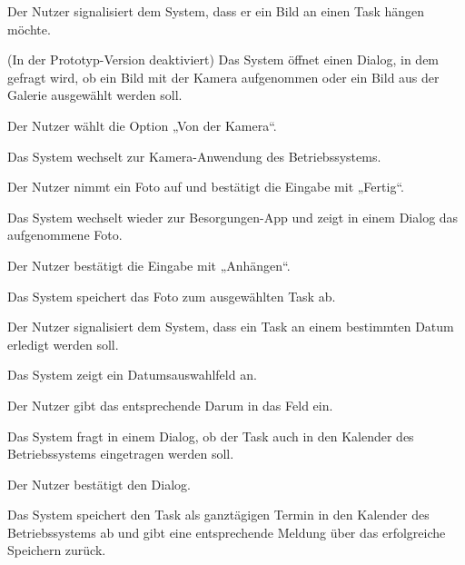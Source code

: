 	\begin{description}
		\begin{verlauf}
		
			\item Der Nutzer signalisiert dem System, dass er ein Bild an einen Task hängen möchte.
			\item (In der Prototyp-Version deaktiviert) Das System öffnet einen Dialog, in dem gefragt wird, ob ein Bild mit der Kamera aufgenommen oder ein Bild aus der Galerie ausgewählt werden soll.
			\item Der Nutzer wählt die Option „Von der Kamera“.
			\item Das System wechselt zur Kamera-Anwendung des Betriebssystems.
			\item Der Nutzer nimmt ein Foto auf und bestätigt die Eingabe mit „Fertig“.
			\item Das System wechselt wieder zur Besorgungen-App und zeigt in einem Dialog das aufgenommene Foto.
			\item Der Nutzer bestätigt die Eingabe mit „Anhängen“.
			\item Das System speichert das Foto zum ausgewählten Task ab.
				
		\end{verlauf}
		
	\end{description}


	\begin{description}
		\actors{Initiiert vom Listenmitglied}
		\begin{verlauf}
		
			\item Der Nutzer signalisiert dem System, dass ein Task an einem bestimmten Datum erledigt werden soll.
			\item Das System zeigt ein Datumsauswahlfeld an.
			\item Der Nutzer gibt das entsprechende Darum in das Feld ein.
			\item Das System fragt in einem Dialog, ob der Task auch in den Kalender des Betriebssystems eingetragen werden soll.
			\item Der Nutzer bestätigt den Dialog.
			\item Das System speichert den Task als ganztägigen Termin in den Kalender des Betriebssystems ab und gibt eine entsprechende Meldung über das erfolgreiche Speichern zurück.
				
		\end{verlauf}
		
	\end{description}


